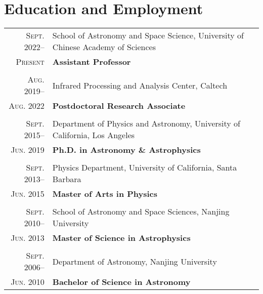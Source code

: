\documentclass[letterpaper,10pt]{article}
\newcommand{\narrow}{-1.8ex}
\begin{document}
\section{Education and Employment}
\vspace*{1ex}
\begin{tabular}{r|p{5.7in}}
    \textsc{Sept. 2022}--     &   School of Astronomy and Space Science, University of Chinese Academy of Sciences  \\
    \textsc{Present}          &   \hfill\textbf{Assistant Professor}    \\
    \multicolumn{2}{c}{} \\[\narrow]
    \textsc{Aug. 2019}--      &   Infrared Processing and Analysis Center, Caltech \\
    \textsc{Aug. 2022}        &   \hfill\textbf{Postdoctoral Research Associate}    \\
    \multicolumn{2}{c}{} \\[\narrow]
    \textsc{Sept. 2015}--     &   Department of Physics and Astronomy, University of California, Los Angeles \\
    \textsc{Jun. 2019}        &   \hfill\textbf{Ph.D. in Astronomy \& Astrophysics} \\
    \multicolumn{2}{c}{} \\[\narrow]
    \textsc{Sept. 2013}--     &   Physics Department, University of California, Santa Barbara     \\
    \textsc{Jun. 2015}        &   \hfill\textbf{Master of Arts in Physics}      \\
    \multicolumn{2}{c}{} \\[\narrow]
    \textsc{Sept. 2010}--     &   School of Astronomy and Space Sciences, Nanjing University      \\
    \textsc{Jun. 2013}        &   \hfill\textbf{Master of Science in Astrophysics}      \\
    \multicolumn{2}{c}{} \\[\narrow]
    \textsc{Sept. 2006}--     &   Department of Astronomy, Nanjing University \\
    \textsc{Jun. 2010}        &   \hfill\textbf{Bachelor of Science in Astronomy}
\end{tabular}
\end{document}
